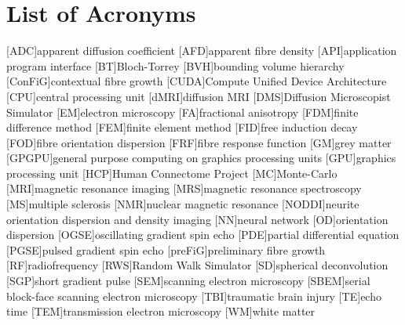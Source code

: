 
\chapter*{List of Acronyms}

\makeatletter
\patchcmd{\AC@@acro}{] #3}{] \MakeUppercase #3}{}{}
\patchcmd{\AC@@acro}{] #3}{] \MakeUppercase #3}{}{}
\makeatother
\begin{acronym}
  [ADC]{apparent diffusion coefficient}
  [AFD]{apparent fibre density}
  [API]{application program interface}
  [BT]{Bloch-Torrey}
  [BVH]{bounding volume hierarchy}
  [ConFiG]{contextual fibre growth}
  [CUDA]{Compute Unified Device Architecture}
  [CPU]{central processing unit}
  [dMRI]{diffusion MRI}
  [DMS]{Diffusion Microscopist Simulator}
  [EM]{electron microscopy}
  [FA]{fractional anisotropy}
  [FDM]{finite difference method}
  [FEM]{finite element method}
  [FID]{free induction decay}
  [FOD]{fibre orientation dispersion}
  [FRF]{fibre response function}
  [GM]{grey matter}
  [GPGPU]{general purpose computing on graphics processing units}
  [GPU]{graphics processing unit}
  [HCP]{Human Connectome Project}
  [MC]{Monte-Carlo}
  [MRI]{magnetic resonance imaging}
  [MRS]{magnetic resonance spectroscopy}
  [MS]{multiple sclerosis}
  [NMR]{nuclear magnetic resonance}
  [NODDI]{neurite orientation dispersion and density imaging}
  [NN]{neural network}
  [OD]{orientation dispersion}
  [OGSE]{oscillating gradient spin echo}
  [PDE]{partial differential equation}
  [PGSE]{pulsed gradient spin echo}
  [preFiG]{preliminary fibre growth}
  [RF]{radiofrequency}
  [RWS]{Random Walk Simulator}
  [SD]{spherical deconvolution}
  [SGP]{short gradient pulse}
  [SEM]{scanning electron microscopy}
  [SBEM]{serial block-face scanning electron microscopy}
  [TBI]{traumatic brain injury}
  [TE]{echo time}
  [TEM]{transmission electron microscopy}
  [WM]{white matter}
\end{acronym}


